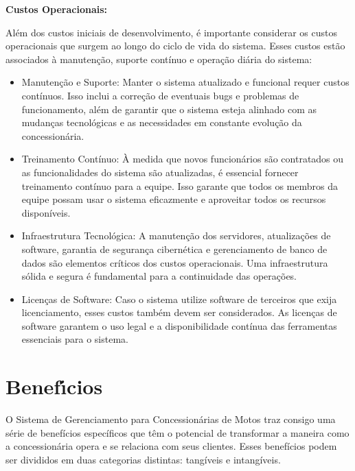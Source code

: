 \textbf{Custos Operacionais:}

Além dos custos iniciais de desenvolvimento, é importante considerar os custos operacionais que surgem ao longo do ciclo de vida do sistema. Esses custos estão associados à manutenção, suporte contínuo e operação diária do sistema:

\begin{itemize}
	\item Manutenção e Suporte: Manter o sistema atualizado e funcional requer custos contínuos. Isso inclui a correção de eventuais bugs e problemas de funcionamento, além de garantir que o sistema esteja alinhado com as mudanças tecnológicas e as necessidades em constante evolução da concessionária.
	
	\item Treinamento Contínuo: À medida que novos funcionários são contratados ou as funcionalidades do sistema são atualizadas, é essencial fornecer treinamento contínuo para a equipe. Isso garante que todos os membros da equipe possam usar o sistema eficazmente e aproveitar todos os recursos disponíveis.
	
	\item Infraestrutura Tecnológica: A manutenção dos servidores, atualizações de software, garantia de segurança cibernética e gerenciamento de banco de dados são elementos críticos dos custos operacionais. Uma infraestrutura sólida e segura é fundamental para a continuidade das operações. 
	
	\item Licenças de Software: Caso o sistema utilize software de terceiros que exija licenciamento, esses custos também devem ser considerados. As licenças de software garantem o uso legal e a disponibilidade contínua das ferramentas essenciais para o sistema.
\end{itemize}


\section{Benef\'{\i}cios}
O Sistema de Gerenciamento para Concessionárias de Motos traz consigo uma série de benefícios específicos que têm o potencial de transformar a maneira como a concessionária opera e se relaciona com seus clientes. Esses benefícios podem ser divididos em duas categorias distintas: tangíveis e intangíveis.

